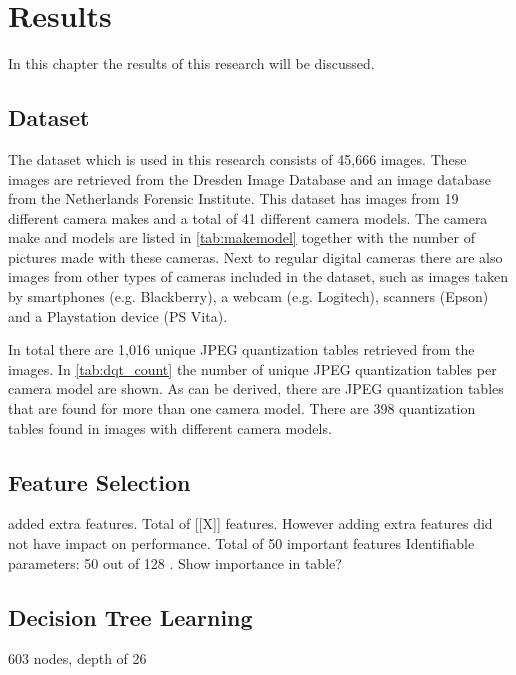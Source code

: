 
\chapter{Results} %

\label{ch:results} %

In this chapter the results of this research will be discussed. %

\section{Dataset}
The dataset which is used in this research consists of 45,666 images. These images are retrieved from the Dresden Image Database \cite{Gloe:2010aa} and an image database from the Netherlands Forensic Institute. This dataset has images from 19 different camera makes and a total of 41 different camera models. The camera make and models are listed in \autoref{tab:makemodel} together with the number of pictures made with these cameras. Next to regular digital cameras there are also images from other types of cameras included in the dataset, such as images taken by smartphones (e.g. Blackberry), a webcam (e.g. Logitech), scanners (Epson) and a Playstation device (PS Vita). 

In total there are 1,016 unique JPEG quantization tables retrieved from the images. In \autoref{tab:dqt_count} the number of unique JPEG quantization tables per camera model are shown. As can be derived, there are JPEG quantization tables that are found for more than one camera model. There are 398 quantization tables found in images with different camera models. 

\section{Feature Selection}
added extra features. Total of [[X]] features. However adding extra features did not have impact on performance.
Total of 50 important features Identifiable parameters: 50 out of 128
. Show importance in table?

\section{Decision Tree Learning}
603 nodes, depth of 26

